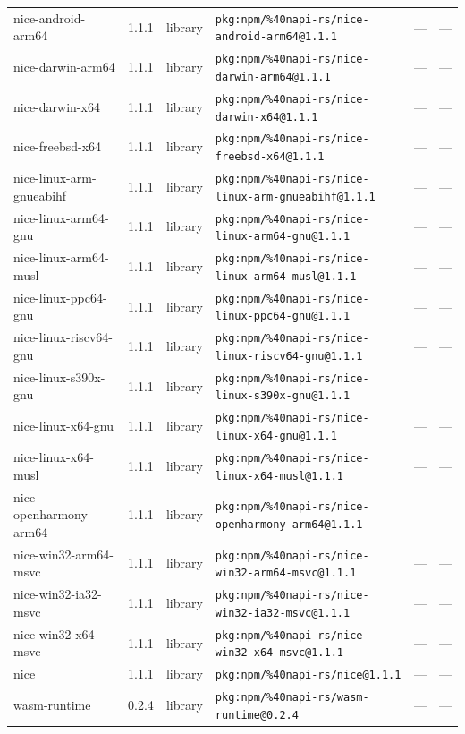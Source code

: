\documentclass[11pt]{article}
\begin{document}
\begin{longtable}{|l|l|l|p{2.2cm}|l|p{4cm}|}
nice-android-arm64 & 1.1.1 & library & \texttt{pkg:npm/\%40napi-rs/nice-android-arm64@1.1.1} & — & — \\
nice-darwin-arm64 & 1.1.1 & library & \texttt{pkg:npm/\%40napi-rs/nice-darwin-arm64@1.1.1} & — & — \\
nice-darwin-x64 & 1.1.1 & library & \texttt{pkg:npm/\%40napi-rs/nice-darwin-x64@1.1.1} & — & — \\
nice-freebsd-x64 & 1.1.1 & library & \texttt{pkg:npm/\%40napi-rs/nice-freebsd-x64@1.1.1} & — & — \\
nice-linux-arm-gnueabihf & 1.1.1 & library & \texttt{pkg:npm/\%40napi-rs/nice-linux-arm-gnueabihf@1.1.1} & — & — \\
nice-linux-arm64-gnu & 1.1.1 & library & \texttt{pkg:npm/\%40napi-rs/nice-linux-arm64-gnu@1.1.1} & — & — \\
nice-linux-arm64-musl & 1.1.1 & library & \texttt{pkg:npm/\%40napi-rs/nice-linux-arm64-musl@1.1.1} & — & — \\
nice-linux-ppc64-gnu & 1.1.1 & library & \texttt{pkg:npm/\%40napi-rs/nice-linux-ppc64-gnu@1.1.1} & — & — \\
nice-linux-riscv64-gnu & 1.1.1 & library & \texttt{pkg:npm/\%40napi-rs/nice-linux-riscv64-gnu@1.1.1} & — & — \\
nice-linux-s390x-gnu & 1.1.1 & library & \texttt{pkg:npm/\%40napi-rs/nice-linux-s390x-gnu@1.1.1} & — & — \\
nice-linux-x64-gnu & 1.1.1 & library & \texttt{pkg:npm/\%40napi-rs/nice-linux-x64-gnu@1.1.1} & — & — \\
nice-linux-x64-musl & 1.1.1 & library & \texttt{pkg:npm/\%40napi-rs/nice-linux-x64-musl@1.1.1} & — & — \\
nice-openharmony-arm64 & 1.1.1 & library & \texttt{pkg:npm/\%40napi-rs/nice-openharmony-arm64@1.1.1} & — & — \\
nice-win32-arm64-msvc & 1.1.1 & library & \texttt{pkg:npm/\%40napi-rs/nice-win32-arm64-msvc@1.1.1} & — & — \\
nice-win32-ia32-msvc & 1.1.1 & library & \texttt{pkg:npm/\%40napi-rs/nice-win32-ia32-msvc@1.1.1} & — & — \\
nice-win32-x64-msvc & 1.1.1 & library & \texttt{pkg:npm/\%40napi-rs/nice-win32-x64-msvc@1.1.1} & — & — \\
nice & 1.1.1 & library & \texttt{pkg:npm/\%40napi-rs/nice@1.1.1} & — & — \\
wasm-runtime & 0.2.4 & library & \texttt{pkg:npm/\%40napi-rs/wasm-runtime@0.2.4} & — & — \\

\end{longtable}
\end{document}
